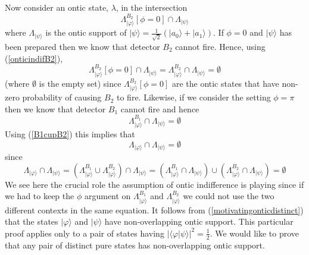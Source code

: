 \documentclass[12pt]{article}
\begin{document}
Now consider an ontic state, $\lambda$, in the intersection \begin{equation} \Lambda_{|\varphi\rangle}^{B_2}[\phi=0]\cap \Lambda_{|\psi\rangle} \end{equation} where $\Lambda_{|\psi\rangle}$
is the ontic support of $|\psi\rangle=\frac{1}{\sqrt{2}}(|a_0\rangle+ |a_1\rangle)$.    If $\phi=0$ and $|\psi\rangle$ has been prepared then we know that detector $B_2$ cannot fire.  Hence,
using (\ref{onticindifB2}), \begin{equation} \Lambda_{|\varphi\rangle}^{B_2}[\phi=0]\cap \Lambda_{|\psi\rangle} = \Lambda_{|\varphi\rangle}^{B_2}\cap \Lambda_{|\psi\rangle} = \emptyset
\end{equation} (where $\emptyset$ is the empty set) since $\Lambda_{|\varphi\rangle}^{B_2}[\phi=0]$ are the ontic states that have non-zero probability of causing $B_2$ to fire.  Likewise,
if we consider the setting $\phi=\pi$ then we know that detector $B_1$ cannot fire and hence \begin{equation} \Lambda_{|\varphi\rangle}^{B_1}\cap \Lambda_{|\psi\rangle} = \emptyset
\end{equation} Using (\ref{B1cupB2}) this implies that \begin{equation}\label{motivatingonticdistinct} \Lambda_{|\varphi\rangle}\cap \Lambda_{|\psi\rangle} = \emptyset \end{equation} since
\begin{equation} \Lambda_{|\varphi\rangle}\cap \Lambda_{|\psi\rangle} = (\Lambda_{|\varphi\rangle}^{B_1} \cup \Lambda_{|\varphi\rangle}^{B_2}) \cap \Lambda_{|\psi\rangle} =
(\Lambda_{|\varphi\rangle}^{B_1} \cap \Lambda_{|\psi\rangle}) \cup (\Lambda_{|\varphi\rangle}^{B_2} \cap \Lambda_{|\psi\rangle}) = \emptyset \end{equation} We see here the crucial role the
assumption of ontic indifference is playing since if we had to keep the $\phi$ argument on $\Lambda_{|\varphi\rangle}^{B_1}$ and $\Lambda_{|\varphi\rangle}^{B_2}$ we could not use the two
different contexts in the same equation.   It follows from (\ref{motivatingonticdistinct}) that the states $|\varphi\rangle$ and $|\psi\rangle$ have non-overlapping ontic support.   This
particular proof applies only to a pair of states having $|\langle \varphi|\psi\rangle|^2=\frac{1}{2}$.  We would like to prove that any pair of distinct pure states has non-overlapping
ontic support.
\end{document}
